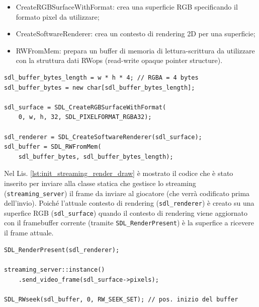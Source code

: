 \begin{itemize}
	\item CreateRGBSurfaceWithFormat: crea una superficie RGB specificando il formato pixel da utilizzare;	
	\item CreateSoftwareRenderer: crea un contesto di rendering 2D per una superficie;
	\item RWFromMem: prepara un buffer di memoria di lettura-scrittura da utilizzare con la struttura dati RWops (read-write opaque pointer structure).	
\end{itemize}

\begin{lstlisting}[caption=Codice aggiunto per la cattura video: inizializzazione. File: \detokenize{osd/modules/render/draw13.cpp}, label={lst:init_streaming_render_init}]
sdl_buffer_bytes_length = w * h * 4; // RGBA = 4 bytes
sdl_buffer_bytes = new char[sdl_buffer_bytes_length];

sdl_surface = SDL_CreateRGBSurfaceWithFormat(
	0, w, h, 32, SDL_PIXELFORMAT_RGBA32);

sdl_renderer = SDL_CreateSoftwareRenderer(sdl_surface);
sdl_buffer = SDL_RWFromMem(
	sdl_buffer_bytes, sdl_buffer_bytes_length);
\end{lstlisting}

Nel Lis. \ref{lst:init_streaming_render_draw} è mostrato il codice che è stato inserito per inviare alla classe statica che gestisce lo streaming (\verb|streaming_server|) il frame da inviare al giocatore (che verrà codificato prima dell'invio). Poiché l'attuale contesto di rendering (\verb|sdl_renderer|) è creato su una superfice RGB (\verb|sdl_surface|) quando il contesto di rendering viene aggiornato con il framebuffer corrente (tramite \verb|SDL_RenderPresent|) è la superfice a ricevere il frame attuale.

\begin{lstlisting}[caption=Codice aggiunto per la cattura video: disegno. File: \detokenize{osd/modules/render/draw13.cpp}, label={lst:init_streaming_render_draw}]
SDL_RenderPresent(sdl_renderer);

streaming_server::instance()
	.send_video_frame(sdl_surface->pixels);

SDL_RWseek(sdl_buffer, 0, RW_SEEK_SET); // pos. inizio del buffer
\end{lstlisting}

